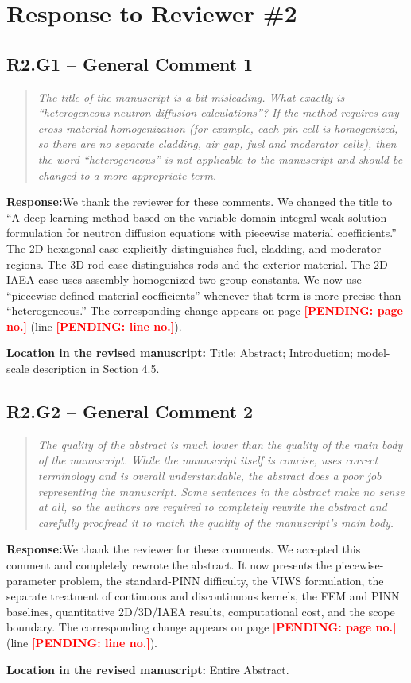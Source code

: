 \documentclass[11pt,a4paper]{article}
\newenvironment{reviewercomment}{\begin{quote}\small\itshape\color{commentgray}}{\end{quote}}
\newcommand{\authorresponse}{\noindent\textbf{Response:}\quad}
\newcommand{\revisionlocation}[1]{\par\noindent\textcolor{locationblue}{\textbf{Location in the revised manuscript: }}#1}
\newcommand{\draftplaceholder}[1]{\textcolor{red}{\textbf{[PENDING: #1]}}}
\begin{document}
\section*{Response to Reviewer \#2}

\subsection*{R2.G1 -- General Comment 1}
\begin{reviewercomment}
The title of the manuscript is a bit misleading. What exactly is ``heterogeneous neutron diffusion calculations''? If the method requires any cross-material homogenization (for example, each pin cell is homogenized, so there are no separate cladding, air gap, fuel and moderator cells), then the word ``heterogeneous'' is not applicable to the manuscript and should be changed to a more appropriate term.
\end{reviewercomment}
\authorresponse We thank the reviewer for these comments. We changed the title to “A deep-learning method based on the variable-domain integral weak-solution formulation for neutron diffusion equations with piecewise material coefficients.” The 2D hexagonal case explicitly distinguishes fuel, cladding, and moderator regions. The 3D rod case distinguishes rods and the exterior material. The 2D-IAEA case uses assembly-homogenized two-group constants. We now use “piecewise-defined material coefficients” whenever that term is more precise than “heterogeneous.” The corresponding change appears on page \draftplaceholder{page no.} (line \draftplaceholder{line no.}).
\revisionlocation{Title; Abstract; Introduction; model-scale description in Section 4.5.}

\subsection*{R2.G2 -- General Comment 2}
\begin{reviewercomment}
The quality of the abstract is much lower than the quality of the main body of the manuscript. While the manuscript itself is concise, uses correct terminology and is overall understandable, the abstract does a poor job representing the manuscript. Some sentences in the abstract make no sense at all, so the authors are required to completely rewrite the abstract and carefully proofread it to match the quality of the manuscript's main body.
\end{reviewercomment}
\authorresponse We thank the reviewer for these comments. We accepted this comment and completely rewrote the abstract. It now presents the piecewise-parameter problem, the standard-PINN difficulty, the VIWS formulation, the separate treatment of continuous and discontinuous kernels, the FEM and PINN baselines, quantitative 2D/3D/IAEA results, computational cost, and the scope boundary. The corresponding change appears on page \draftplaceholder{page no.} (line \draftplaceholder{line no.}).
\revisionlocation{Entire Abstract.}
\end{document}
